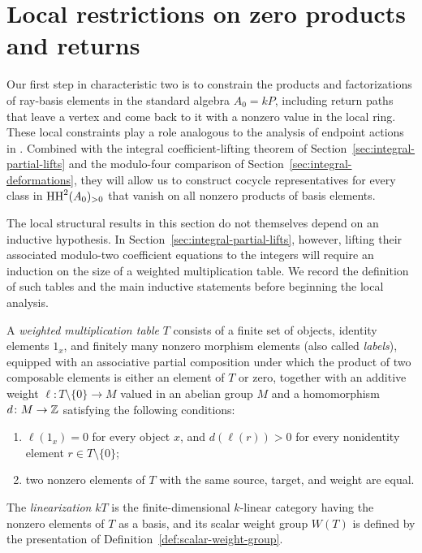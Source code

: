 \section{Local restrictions on zero products and returns}
\label{sec:local-ray-geometry}

Our first step in characteristic two is to constrain the products and factorizations of ray-basis elements in the standard algebra $A_0=kP$, including return paths that leave a vertex and come back to it with a nonzero value in the local ring. These local constraints play a role analogous to the analysis of endpoint actions in \cite[Sections~2.4--2.5]{BGRS}. Combined with the integral coefficient-lifting theorem of Section~\ref{sec:integral-partial-lifts} and the modulo-four comparison of Section~\ref{sec:integral-deformations}, they will allow us to construct cocycle representatives for every class in $\operatorname{HH}^2(A_0)_{>0}$ that vanish on all nonzero products of basis elements.

The local structural results in this section do not themselves depend on an inductive hypothesis. In Section~\ref{sec:integral-partial-lifts}, however, lifting their associated modulo-two coefficient equations to the integers will require an induction on the size of a weighted multiplication table. We record the definition of such tables and the main inductive statements before beginning the local analysis.

\begin{definition}
\label{def:weighted-table}
A \emph{weighted multiplication table} $T$ consists of a finite set of objects, identity elements $1_x$, and finitely many nonzero morphism elements (also called \emph{labels}), equipped with an associative partial composition under which the product of two composable elements is either an element of $T$ or zero, together with an additive weight $\ell\colon T\setminus\{0\}\to M$ valued in an abelian group $M$ and a homomorphism $d\colon M\to\mathbb Z$ satisfying the following conditions:
\begin{enumerate}[label={\upshape(\roman*)}]
\item $\ell(1_x)=0$ for every object $x$, and $d(\ell(r))>0$ for every nonidentity element $r\in T\setminus\{0\}$;
\item two nonzero elements of $T$ with the same source, target, and weight are equal.
\end{enumerate}
The \emph{linearization} $kT$ is the finite-dimensional $k$-linear category having the nonzero elements of $T$ as a basis, and its scalar weight group $W(T)$ is defined by the presentation of Definition~\ref{def:scalar-weight-group}.
\end{definition}

